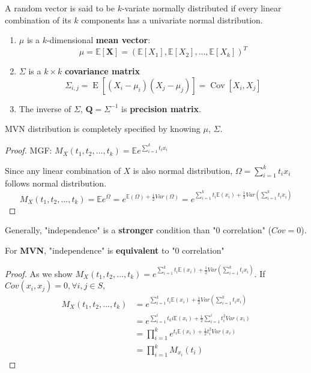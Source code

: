 \documentclass[11pt]{elegantbook}
\begin{document}
A random vector is said to be $k$-variate normally distributed if every linear combination of its $k$ components has a univariate normal distribution.
\begin{enumerate}[(1)]
    \item $\mu$ is a $k$-dimensional \textbf{mean vector}: $$\mu=\mathbb{E}[\mathbf{X}]=(\mathbb{E}[X_1],\mathbb{E}[X_2],...,\mathbb{E}[X_k])^T$$
    \item $\Sigma$ is a $k\times k$ \textbf{covariance matrix}$${\displaystyle \Sigma _{i,j}=\operatorname {E} [(X_{i}-\mu _{i})(X_{j}-\mu _{j})]=\operatorname {Cov} [X_{i},X_{j}]}$$
    \item The inverse of $\Sigma$, ${\boldsymbol {Q}}={\Sigma }^{-1}$ is \textbf{precision matrix}.
\end{enumerate}
\begin{theorem}
    MVN distribution is completely specified by knowing $\mu$, $\Sigma$.
\end{theorem}
\begin{proof}
MGF: $M_X(t_1,t_2,...,t_k)=\mathbb{E}e^{\sum_{i=1}^k t_ix_i}$

Since any linear combination of $X$ is also normal distribution, $\Omega=\sum_{i=1}^k t_ix_i$ follows normal distribution.
$$M_X(t_1,t_2,...,t_k)=\mathbb{E}e^\Omega=e^{\mathbb{E}(\Omega)+\frac{1}{2}Var(\Omega)}=e^{\sum_{i=1}^kt_i \mathbb{E}(x_i)+\frac{1}{2}Var(\sum_{i=1}^k t_ix_i)}$$
\end{proof}

Generally, "independence" is a \textbf{stronger} condition than "$0$ correlation" ($Cov=0$).
\begin{theorem}
    For \textbf{MVN}, "independence" is \textbf{equivalent} to "$0$ correlation"
\end{theorem}
\begin{proof}
As we show $M_X(t_1,t_2,...,t_k)=e^{\sum_{i=1}^kt_i \mathbb{E}(x_i)+\frac{1}{2}Var(\sum_{i=1}^k t_ix_i)}$. If $Cov(x_i,x_j)=0,\forall i,j\in S$,
\begin{equation}
    \begin{aligned}
        M_X(t_1,t_2,...,t_k)&=e^{\sum_{i=1}^kt_i \mathbb{E}(x_i)+\frac{1}{2}Var(\sum_{i=1}^k t_ix_i)}\\
        &=e^{\sum_{i=1}^it_ki \mathbb{E}(x_i)+\frac{1}{2}\sum_{i=1}^it_i^2Var(x_i)}\\
        &=\prod_{i=1}^ke^{t_i\mathbb{E}(x_i)+\frac{1}{2}t_i^2Var(x_i)}\\
        &=\prod_{i=1}^kM_{x_i}(t_i)
    \end{aligned}
    \nonumber
\end{equation}
\end{proof}
\end{document}
